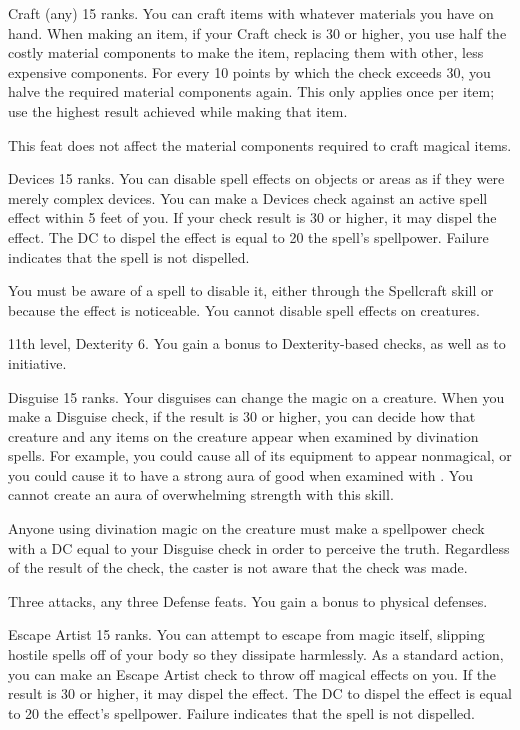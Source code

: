 \featpre Craft (any) 15 ranks.
\featben You can craft items with whatever materials you have on hand.
When making an item, if your Craft check is 30 or higher, you use half the costly material components to make the item, replacing them with other, less expensive components.
For every 10 points by which the check exceeds 30, you halve the required material components again.
This only applies once per item; use the highest result achieved while making that item.

This feat does not affect the material components required to craft magical items.

\featpre Devices 15 ranks.
\featben You can disable spell effects on objects or areas as if they were merely complex devices.
You can make a Devices check against an active spell effect within 5 feet of you.
If your check result is 30 or higher, it may dispel the effect.
The DC to dispel the effect is equal to 20 \add the spell's spellpower.
Failure indicates that the spell is not dispelled.

You must be aware of a spell to disable it, either through the Spellcraft skill or because the effect is noticeable.
You cannot disable spell effects on creatures.

\featpres 11th level, Dexterity 6.
\featben You gain a  bonus to Dexterity-based checks, as well as to initiative.

\featpre Disguise 15 ranks.
\featben Your disguises can change the magic on a creature.
When you make a Disguise check, if the result is 30 or higher, you can decide how that creature and any items on the creature appear when examined by divination spells.
For example, you could cause all of its equipment to appear nonmagical, or you could cause it to have a strong aura of good when examined with .
You cannot create an aura of overwhelming strength with this skill.

Anyone using divination magic on the creature must make a spellpower check with a DC equal to your Disguise check in order to perceive the truth.
Regardless of the result of the check, the caster is not aware that the check was made.

\featpres Three attacks, any three Defense feats.
\featben You gain a  bonus to physical defenses.

\featpre Escape Artist 15 ranks.
\featben You can attempt to escape from magic itself, slipping hostile spells off of your body so they dissipate harmlessly.
As a standard action, you can make an Escape Artist check to throw off magical effects on you.
If the result is 30 or higher, it may dispel the effect.
The DC to dispel the effect is equal to 20 \add the effect's spellpower.
Failure indicates that the spell is not dispelled.

